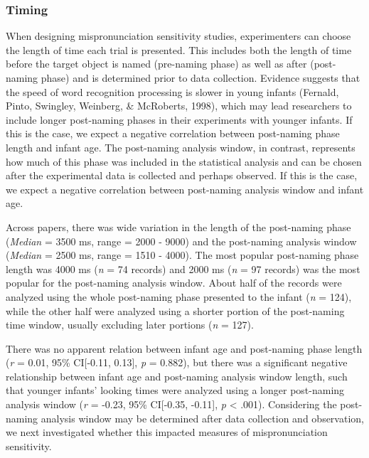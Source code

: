 \documentclass[man, noextraspace]{apa6}
\begin{document}
\hypertarget{timing}{%
\subsubsection{Timing}\label{timing}}

When designing mispronunciation sensitivity studies, experimenters can choose the length of time each trial is presented. This includes both the length of time before the target object is named (pre-naming phase) as well as after (post-naming phase) and is determined prior to data collection. Evidence suggests that the speed of word recognition processing is slower in young infants (Fernald, Pinto, Swingley, Weinberg, \& McRoberts, 1998), which may lead researchers to include longer post-naming phases in their experiments with younger infants. If this is the case, we expect a negative correlation between post-naming phase length and infant age. The post-naming analysis window, in contrast, represents how much of this phase was included in the statistical analysis and can be chosen after the experimental data is collected and perhaps observed. If this is the case, we expect a negative correlation between post-naming analysis window and infant age.

Across papers, there was wide variation in the length of the post-naming phase (\emph{Median} = 3500 ms, range = 2000 - 9000) and the post-naming analysis window (\emph{Median} = 2500 ms, range = 1510 - 4000). The most popular post-naming phase length was 4000 ms (\emph{n} = 74 records) and 2000 ms (\emph{n} = 97 records) was the most popular for the post-naming analysis window. About half of the records were analyzed using the whole post-naming phase presented to the infant (\emph{n} = 124), while the other half were analyzed using a shorter portion of the post-naming time window, usually excluding later portions (\emph{n} = 127).

There was no apparent relation between infant age and post-naming phase length (\emph{r} = 0.01, 95\% CI{[}-0.11, 0.13{]}, \emph{p} = 0.882), but there was a significant negative relationship between infant age and post-naming analysis window length, such that younger infants' looking times were analyzed using a longer post-naming analysis window (\emph{r} = -0.23, 95\% CI{[}-0.35, -0.11{]}, \emph{p} \textless{} .001). Considering the post-naming analysis window may be determined after data collection and observation, we next investigated whether this impacted measures of mispronunciation sensitivity.
\end{document}
